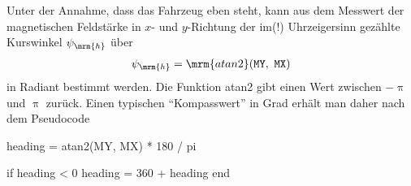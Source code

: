 Unter der Annahme, dass das Fahrzeug eben steht, kann aus dem Messwert der magnetischen Feldstärke in $x$- und $y$-Richtung der im(!) Uhrzeigersinn gezählte Kurswinkel $\psi_\mrm{h}$ über
\begin{align*}
	\psi_\mrm{h} = \mrm{atan2}(\mathtt{MY},\ \mathtt{MX})
\end{align*}
in Radiant bestimmt werden. Die Funktion atan2 gibt einen Wert zwischen $-\uppi$ und $\uppi$ zurück. Einen typischen "`Kompasswert"' in Grad erhält man daher nach dem Pseudocode
\begin{verbatimtab}[4]
	heading = atan2(MY, MX) * 180 / pi
	
	if heading < 0
		heading = 360 + heading
	end
\end{verbatimtab}





